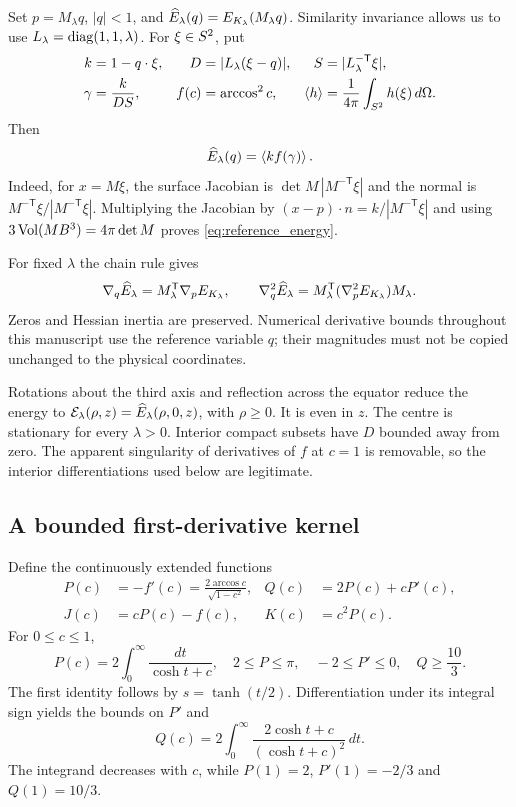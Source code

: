Set $p=M_\lambda q$, $|q|<1$, and $\widehat E_\lambda(q)=E_{K_\lambda}(M_\lambda q)$. Similarity invariance allows us to use $L_\lambda=\operatorname{diag}(1,1,\lambda)$. For $\xi\in S^2$, put
\begin{align}
 k&=1-q\cdot\xi,& D&=|L_\lambda(\xi-q)|,& S&=|L_\lambda^{-\mathsf T}\xi|,\label{eq:reference_variables}\\
 \gamma&=\frac{k}{DS},& f(c)&=\arccos^2c,&
 \left\langle h\right\rangle&=\frac1{4\pi}\int_{S^2}h(\xi)\,d\Omega.\nonumber
\end{align}
Then
\begin{equation}\label{eq:reference_energy}
 \widehat E_\lambda(q)=\left\langle kf(\gamma)\right\rangle.
\end{equation}
Indeed, for $x=M\xi$, the surface Jacobian is $\det M\,|M^{-\mathsf T}\xi|$ and the normal is $M^{-\mathsf T}\xi/|M^{-\mathsf T}\xi|$. Multiplying the Jacobian by $(x-p)\cdot n=k/|M^{-\mathsf T}\xi|$ and using $3\operatorname{Vol}(MB^3)=4\pi\det M$ proves \eqref{eq:reference_energy}.

For fixed $\lambda$ the chain rule gives
\begin{equation}\label{eq:coordinate_hessian}
 \nabla_q\widehat E_\lambda=M_\lambda^{\mathsf T}\nabla_pE_{K_\lambda},\qquad
 \nabla_q^2\widehat E_\lambda=M_\lambda^{\mathsf T}(\nabla_p^2E_{K_\lambda})M_\lambda.
\end{equation}
Zeros and Hessian inertia are preserved. Numerical derivative bounds throughout this manuscript use the reference variable $q$; their magnitudes must not be copied unchanged to the physical coordinates.

Rotations about the third axis and reflection across the equator reduce the energy to $\mathcal E_\lambda(\rho,z)=\widehat E_\lambda(\rho,0,z)$, with $\rho\ge0$. It is even in $z$. The centre is stationary for every $\lambda>0$. Interior compact subsets have $D$ bounded away from zero. The apparent singularity of derivatives of $f$ at $c=1$ is removable, so the interior differentiations used below are legitimate.

\subsection{A bounded first-derivative kernel}
Define the continuously extended functions
\begin{align}
 P(c)&=-f'(c)=\frac{2\arccos c}{\sqrt{1-c^2}},& Q(c)&=2P(c)+cP'(c),\label{eq:PQ}\\
 J(c)&=cP(c)-f(c),& K(c)&=c^2P(c).\nonumber
\end{align}
For $0\le c\le1$,
\begin{equation}\label{eq:PQbounds}
 P(c)=2\int_0^\infty\frac{dt}{\cosh t+c},\quad
 2\le P\le\pi,\quad -2\le P'\le0,\quad Q\ge\frac{10}{3}.
\end{equation}
The first identity follows by $s=\tanh(t/2)$. Differentiation under its integral sign yields the bounds on $P'$ and
\[
 Q(c)=2\int_0^\infty\frac{2\cosh t+c}{(\cosh t+c)^2}\,dt.
\]
The integrand decreases with $c$, while $P(1)=2$, $P'(1)=-2/3$ and $Q(1)=10/3$.

